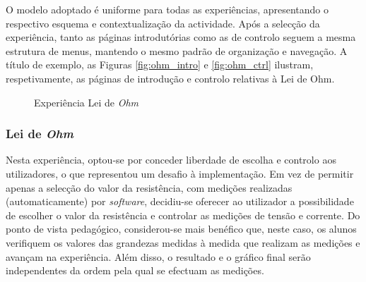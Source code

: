 O modelo adoptado é uniforme para todas as experiências, apresentando o respectivo esquema e contextualização da actividade. Após a selecção da experiência, tanto as páginas introdutórias como as de controlo seguem a mesma estrutura de menus, mantendo o mesmo padrão de organização e navegação. A título de exemplo, as Figuras \ref{fig:ohm_intro} e \ref{fig:ohm_ctrl} ilustram, respetivamente, as páginas de introdução e controlo relativas à Lei de Ohm. 


\begin{figure}[hbtp]
	\centering%
		\centering
		\qquad
		\caption{ Experiência Lei de \textit{Ohm}}%
		\label{fig:pagohm}%
	\end{figure}

\subsubsection{Lei de \textit{Ohm}}
Nesta experiência, optou-se por conceder liberdade de escolha e controlo aos utilizadores, o que representou um desafio à implementação. Em vez de permitir apenas a selecção do valor da resistência, com medições realizadas (automaticamente) por \textit{software}, decidiu-se oferecer ao utilizador a possibilidade de escolher o valor da resistência e controlar as medições de tensão e corrente. Do ponto de vista pedagógico, considerou-se mais benéfico que, neste caso, os alunos verifiquem os valores das grandezas medidas à medida que realizam as medições e avançam na experiência. Além disso, o resultado e o gráfico final serão independentes da ordem pela qual se efectuam as medições.

